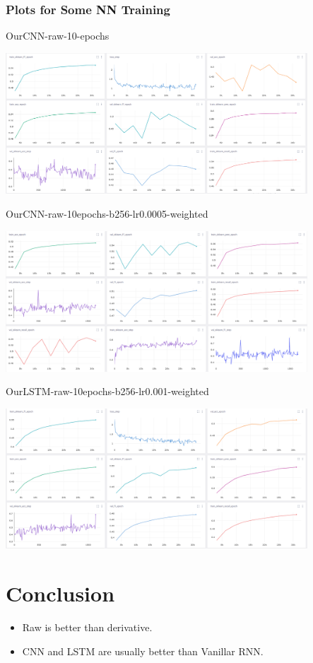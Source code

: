 \documentclass[12pt,a4paper]{article}
\begin{document}
\subsubsection{Plots for Some NN Training}
OurCNN-raw-10-epochs
\begin{center}
\includegraphics[width=320pt]{imgs/comet1.png}
\end{center}
\newpage
OurCNN-raw-10epochs-b256-lr0.0005-weighted
\begin{center}
\includegraphics[width=320pt]{imgs/comet2.png}
\end{center}
OurLSTM-raw-10epochs-b256-lr0.001-weighted
\begin{center}
\includegraphics[width=320pt]{imgs/comet3.png}
\end{center}


        
        \newpage
    \section{Conclusion}
    \begin{itemize}
  \item Raw is better than derivative.
  \item CNN and LSTM are usually better than Vanillar RNN.
\end{itemize}

    


    
    
\end{document}
